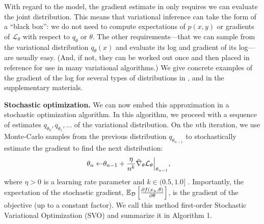 


With regard to the model, the gradient estimate in 
only requires we can evaluate the joint distribution.  This means that
variational inference can take the form of a ``black box'': we do not
need to compute expectations of $p(x, y)$ or gradients of
$\mathcal{L}_\theta$ with respect to $q_\theta$ or $\theta$.  The
other requirements---that we can sample from the variational
distribution $q_\theta(x)$ and evaluate its log and gradient of its
log---are usually easy.  (And, if not, they can be worked out once and
then placed in reference for use in many variational algorithms.)  We
give concrete examples of the gradient of the log for several types of
distributions in ,  and
in the supplementary materials.



\textbf{Stochastic optimization.}  We can now embed this approximation
in a stochastic optimization algorithm.  In this algorithm, we proceed
with a sequence of estimates $q_{\theta_0}, q_{\theta_1}, \ldots$ of
the variational distribution. On the $n$th iteration, we use
Monte-Carlo samples from the previous distribution $q_{\theta_{n-1}}$
to stochastically estimate the gradient to find the next
distribution:
\begin{align}
  \label{eq:svo_update}
  \theta_n \gets & \theta_{n-1} +
  \frac{\eta}{n^k} {\tilde \nabla_{  \theta }{ \mathcal{L}_\theta }} \Bigr|_{\theta_{n-1}},
\end{align}
where $\eta > 0$ is a learning rate parameter and $k \in (0.5, 1.0]$
  \cite{carbonetto:2009}. Importantly, the expectation of the
  stochastic gradient, $\mathbb{E}_{\mathcal{D}}\left[\frac{\partial f(x_n, \theta)}{\partial \theta}\right]$, is
  the gradient of the objective (up to a constant factor).
We call this method first-order Stochastic Variational Optimization
(SVO) and summarize it in Algorithm 1. %

